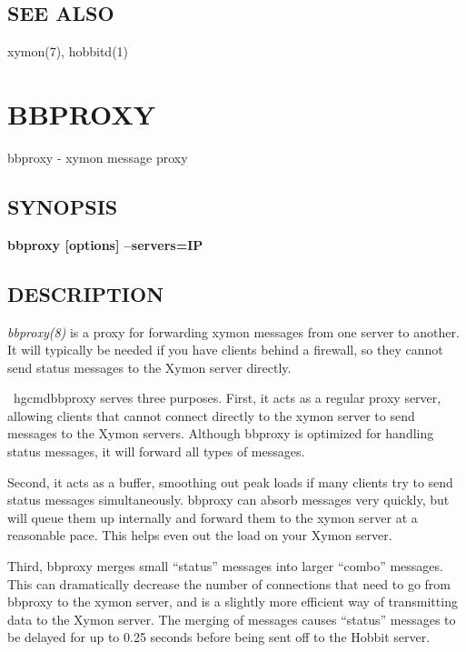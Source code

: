 \subsection{SEE ALSO}
xymon(7), hobbitd(1) 

%
%

\newpage
\section{BBPROXY}

 bbproxy - xymon message proxy 
\subsection{SYNOPSIS}
\textbf{bbproxy [options] --servers=IP}

 
\subsection{DESCRIPTION}
\emph{bbproxy(8)}
 is a proxy for forwarding xymon messages from one server to another. It will typically be needed if you have clients behind a firewall, so they cannot send status messages to the Xymon server directly. 

 ~\cite{web:patchutils}hgcmd{bbproxy} serves three purposes. First, it acts as a regular proxy server, allowing clients that cannot connect directly to the xymon server to send messages to the Xymon servers. Although bbproxy is optimized for handling status messages, it will forward all types of messages.  



  Second, it acts as a buffer, smoothing out peak loads if many clients try to send status messages simultaneously. bbproxy can absorb messages very quickly, but will queue them up internally and forward them to the xymon server at a reasonable pace. This helps even out the load on your Xymon server.  



  Third, bbproxy merges small ``status'' messages into larger ``combo'' messages. This can dramatically decrease the number of connections that need to go from bbproxy to the xymon server, and is a slightly more efficient way of transmitting data to the Xymon server. The merging of messages causes ``status'' messages to be delayed for up to 0.25 seconds before being sent off to the Hobbit server. 


